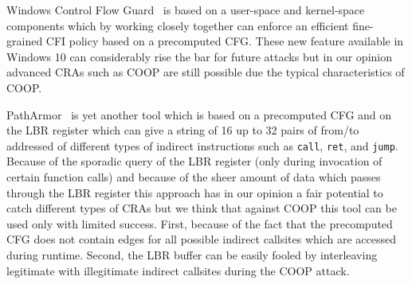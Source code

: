 Windows Control Flow Guard~\cite{windows:cfguard} is based on a user-space and kernel-space components which
by working closely together can enforce an efficient fine-grained CFI policy based on a precomputed CFG.
These new feature available in Windows 10 can considerably rise the bar for future attacks but in our opinion advanced CRAs
such as COOP are still possible due the typical characteristics of COOP.

PathArmor~\cite{veen:cfi} is yet another tool which is based on a precomputed CFG and on the LBR register which can give a string of 16 up to
32 pairs of from/to addressed of different types of indirect instructions such as \texttt{call}, \texttt{ret}, and \texttt{jump}. 
Because of the sporadic query of the LBR register (only during invocation of certain function calls) and because of the sheer amount of 
data which passes through the LBR register this approach has in our opinion a fair potential to catch different types of CRAs but
we think that against COOP this tool can be used only with limited success. 
First, because of the fact that the precomputed CFG does not contain edges for all
possible indirect callsites which are accessed during runtime. Second, the LBR buffer can be easily fooled by interleaving
legitimate with illegitimate indirect callsites during the COOP attack.


